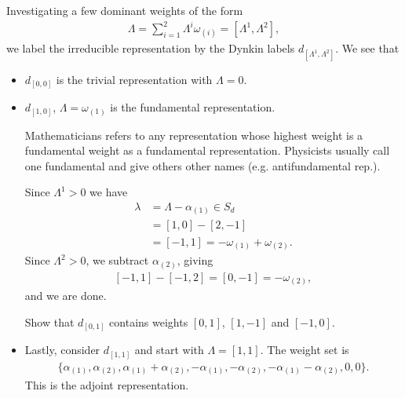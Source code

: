 Investigating a few dominant weights of the form
\begin{align}
    \Lambda = \sum_{i=1}^{2} \Lambda^{i} \omega_{\left( i \right) } = \left[ \Lambda^{1},\Lambda^{2}  \right]  
,\end{align}
we label the irreducible representation by the Dynkin labels $d_{\left[ \Lambda^{1}, \Lambda^{2} \right] }$. We see that
    \begin{itemize}
        \item $d_{\left[ 0,0 \right] }$ is the trivial representation with $\Lambda= 0$.
        \item $d_{\left[ 1,0 \right] }$, $\Lambda = \omega_{\left( 1 \right) }$ is the fundamental representation.
            \begin{note}
                Mathematicians refers to any representation whose highest weight is a fundamental weight as a fundamental representation. Physicists usually call one fundamental and give others other names (e.g. antifundamental rep.).
            \end{note}
            Since $\Lambda^{1} > 0 $ we have 
            \begin{align}
                \lambda &= \Lambda - \alpha_{\left( 1 \right) } \in S_d \\
                &= \left[ 1,0 \right] - \left[ 2,-1 \right]  \\
                &= \left[ -1,1 \right] = -\omega_{\left( 1 \right) } + \omega_{\left( 2 \right) }
            .\end{align}
            Since $\Lambda^2 > 0$, we subtract $\alpha_{\left( 2 \right) }$, giving
            \begin{align}
                \left[ -1,1 \right] - \left[ -1,2 \right] = \left[ 0,-1 \right] = - \omega_{\left( 2 \right) }
            ,\end{align}
            and we are done.
            \begin{exercise}
                Show that $d_{\left[ 0,1 \right] }$ contains weights $\left[ 0,1 \right] $, $\left[ 1,-1 \right] $ and $\left[ -1,0 \right] $.
            \end{exercise}
        \item Lastly, consider $d_{\left[ 1,1 \right] }$ and start with $\Lambda = \left[ 1,1 \right] $. The weight set is
            \begin{align}
                \{\alpha_{\left( 1 \right)} , \alpha_{\left( 2 \right) }, \alpha_{\left( 1 \right) } + \alpha_{\left( 2 \right) }, -\alpha_{\left( 1 \right) }, - \alpha_{\left( 2 \right) }, -\alpha_{\left( 1 \right) } - \alpha_{\left( 2 \right) },0,0\} 
            .\end{align}
            This is the adjoint representation.
    \end{itemize}

